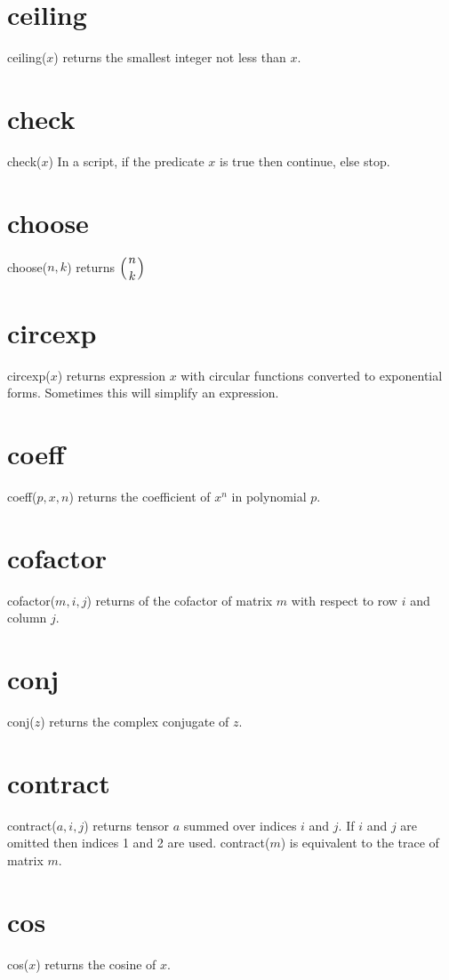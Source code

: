 \documentclass[11pt]{article}
\begin{document}
\section*{ceiling}
ceiling($x$) returns the smallest integer not less than $x$.

\section*{check}
check($x$) In a script, if the predicate $x$ is true then continue, else stop.

\section*{choose}
choose($n,k$) returns $\displaystyle\left({n \atop k}\right)$

\section*{circexp}
circexp($x$) returns expression $x$ with circular functions converted
to exponential forms.
Sometimes this will simplify an expression.

\section*{coeff}
coeff($p,x,n$) returns the coefficient of $x^n$ in polynomial $p$.

\section*{cofactor}
cofactor($m,i,j$) returns of the cofactor of matrix $m$ with respect to row $i$ and column $j$.

\section*{conj}
conj($z$) returns the complex conjugate of $z$.

\section*{contract}
contract($a,i,j$) returns tensor $a$ summed over indices $i$ and $j$.
If $i$ and $j$ are omitted then indices 1 and 2 are used.
contract($m$) is equivalent to the trace of matrix $m$.

\section*{cos}
cos($x$) returns the cosine of $x$.
\end{document}
